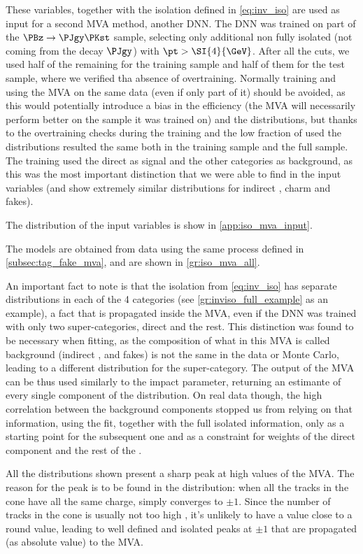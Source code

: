 These variables, together with the isolation defined in \autoref{eq:inv_iso} are used as input for a second MVA method, another DNN.
The DNN was trained on part of the $\PBz\to\PJgy\PKst$ sample, selecting only additional non fully isolated \Pgm (not coming from the decay $\PJgy$) with $\pt > \SI{4}{\GeV}$.
After all the cuts, we used half of the remaining \Pgm for the training sample and half of them for the test sample, where we verified tha absence of overtraining.
Normally training and using the MVA on the same data (even if only part of it) should be avoided, as this would potentially introduce a bias in the efficiency (the MVA will necessarily perform better on the sample it was trained on) and the distributions, but thanks to the overtraining checks during the training and the low fraction of \Pgm used the distributions resulted the same both in the training sample and the full sample.
The training used the direct \Pgm as signal and the other categories as background, as this was the most important distinction that we were able to find in the input variables (\cc and \dr show extremely similar distributions for indirect \Pgm, charm \Pgm and fakes).

The distribution of the input variables is show in \autoref{app:iso_mva_input}.

The models are obtained from data using the same process defined in \autoref{subsec:tag_fake_mva}, and are shown in \autoref{gr:iso_mva_all}.



An important fact to note is that the isolation from \autoref{eq:inv_iso} has separate distributions in each of the 4 categories (see \autoref{gr:inviso_full_example} as an example), a fact that is propagated inside the MVA, even if the DNN was trained with only two super-categories, direct \Pgm and the rest.
This distinction was found to be necessary when fitting, as the composition of what in this MVA is called background (indirect \Pqb \Pgm, \Pqc \Pgm and fakes) is not the same in the data or Monte Carlo, leading to a different distribution for the super-category.
The output of the MVA can be thus used similarly to the impact parameter, returning an estimante of every single component of the distribution.
On real data though, the high correlation between the background components stopped us from relying on that information, using the fit, together with the full isolated \Pgm information, only as a starting point for the subsequent one and as a constraint for weights of the direct component and the rest of the \Pgm.

All the distributions shown present a sharp peak at high values of the MVA.
The reason for the peak is to be found in the \cc distribution: when all the tracks in the cone have all the same charge, \cc simply converges to $\pm 1$.
Since the number of tracks in the cone is usually not too high , it's unlikely to have a \cc value close to a round value, leading to well defined and isolated peaks at $\pm 1$ that are propagated (as absolute value) to the MVA.
